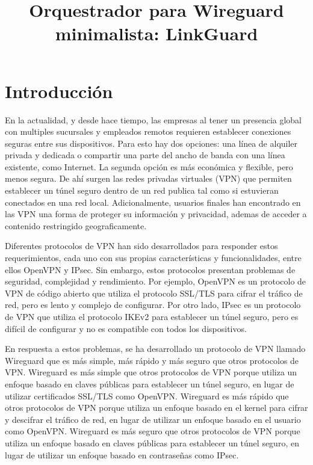 \documentclass[letterpaper,12pt,oneside]{book}
\title{Orquestrador para Wireguard minimalista: LinkGuard}
\begin{document}
\maketitle


\section{Introducción}

En la actualidad, y desde hace tiempo, las empresas al tener un presencia global con multiples sucursales y empleados remotos requieren establecer conexiones seguras entre sus dispositivos. Para esto hay dos opciones: una línea de alquiler privada y dedicada o compartir una parte del ancho de banda con una línea existente, como Internet. La segunda opción es más económica y flexible, pero menos segura. De ahí surgen las redes privadas virtuales (VPN) que permiten establecer un túnel seguro dentro de un red publica tal como si estuvieran conectados en una red local. Adicionalmente, usuarios finales han encontrado en las VPN una forma de proteger su información y privacidad, ademas de acceder a contenido restringido geograficamente.

Diferentes protocolos de VPN han sido desarrollados para responder estos requerimientos, cada uno con sus propias características y funcionalidades, entre ellos OpenVPN y IPsec. Sin embargo, estos protocolos presentan problemas de seguridad, complejidad y rendimiento. Por ejemplo, OpenVPN es un protocolo de VPN de código abierto que utiliza el protocolo SSL/TLS para cifrar el tráfico de red, pero es lento y complejo de configurar. Por otro lado, IPsec es un protocolo de VPN que utiliza el protocolo IKEv2 para establecer un túnel seguro, pero es difícil de configurar y no es compatible con todos los dispositivos.

En respuesta a estos problemas, se ha desarrollado un protocolo de VPN llamado Wireguard que es más simple, más rápido y más seguro que otros protocolos de VPN. Wireguard es más simple que otros protocolos de VPN porque utiliza un enfoque basado en claves públicas para establecer un túnel seguro, en lugar de utilizar certificados SSL/TLS como OpenVPN. Wireguard es más rápido que otros protocolos de VPN porque utiliza un enfoque basado en el kernel para cifrar y descifrar el tráfico de red, en lugar de utilizar un enfoque basado en el usuario como OpenVPN. Wireguard es más seguro que otros protocolos de VPN porque utiliza un enfoque basado en claves públicas para establecer un túnel seguro, en lugar de utilizar un enfoque basado en contraseñas como IPsec.
\end{document}
